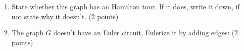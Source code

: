 \documentclass[12pt]{exam}
\begin{document}
\begin{enumerate}
\begin{enumerate}
    \vspace{7em}
    \vfill
    \item State whether this graph has an Hamilton tour. If it does, write it down, if not state why it doesn't. (2 points)
    \vspace{7em}
    \vfill
    \item The graph $G$ doesn't have an Euler circuit, Eulerize it by adding edges: (2 points)
    \begin{figure}[h!]
        \centering
    
        \begin{tikzpicture}[x=0.75pt,y=0.75pt,yscale=-1,xscale=1]
        

\end{tikzpicture}
\end{figure}
\end{enumerate}
\end{enumerate}
\end{document}
